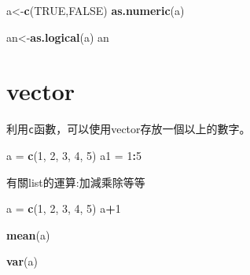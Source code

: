 \documentclass[]{book}
\newenvironment{Shaded}{\begin{snugshade}}{\end{snugshade}}
\newcommand{\DecValTok}[1]{\textcolor[rgb]{0.00,0.00,0.81}{#1}}
\newcommand{\KeywordTok}[1]{\textcolor[rgb]{0.13,0.29,0.53}{\textbf{#1}}}
\newcommand{\NormalTok}[1]{#1}
\newcommand{\OperatorTok}[1]{\textcolor[rgb]{0.81,0.36,0.00}{\textbf{#1}}}
\newcommand{\OtherTok}[1]{\textcolor[rgb]{0.56,0.35,0.01}{#1}}
\newcommand{\StringTok}[1]{\textcolor[rgb]{0.31,0.60,0.02}{#1}}
\theoremstyle{definition}
\theoremstyle{definition}
\theoremstyle{definition}
\theoremstyle{remark}
\begin{document}
\begin{Shaded}
\begin{Highlighting}[]
\NormalTok{a<-}\KeywordTok{c}\NormalTok{(}\OtherTok{TRUE}\NormalTok{,}\OtherTok{FALSE}\NormalTok{)}
\KeywordTok{as.numeric}\NormalTok{(a)}
\end{Highlighting}
\end{Shaded}

\begin{Shaded}
\begin{Highlighting}[]
\NormalTok{an<-}\KeywordTok{as.logical}\NormalTok{(a)}
\NormalTok{an}
\end{Highlighting}
\end{Shaded}

\hypertarget{vector}{%
\section{vector}\label{vector}}

利用\texttt{c}函數，可以使用vector存放一個以上的數字。

\begin{Shaded}
\begin{Highlighting}[]
\NormalTok{a =}\StringTok{ }\KeywordTok{c}\NormalTok{(}\DecValTok{1}\NormalTok{, }\DecValTok{2}\NormalTok{, }\DecValTok{3}\NormalTok{, }\DecValTok{4}\NormalTok{, }\DecValTok{5}\NormalTok{)}
\NormalTok{a1 =}\StringTok{ }\DecValTok{1}\OperatorTok{:}\DecValTok{5}
\end{Highlighting}
\end{Shaded}

有關list的運算:加減乘除等等

\begin{Shaded}
\begin{Highlighting}[]
\NormalTok{a =}\StringTok{ }\KeywordTok{c}\NormalTok{(}\DecValTok{1}\NormalTok{, }\DecValTok{2}\NormalTok{, }\DecValTok{3}\NormalTok{, }\DecValTok{4}\NormalTok{, }\DecValTok{5}\NormalTok{)}
\NormalTok{a}\OperatorTok{+}\DecValTok{1}
\end{Highlighting}
\end{Shaded}

\begin{Shaded}
\begin{Highlighting}[]
\KeywordTok{mean}\NormalTok{(a)}
\end{Highlighting}
\end{Shaded}

\begin{Shaded}
\begin{Highlighting}[]
\KeywordTok{var}\NormalTok{(a)}
\end{Highlighting}
\end{Shaded}
\end{document}

